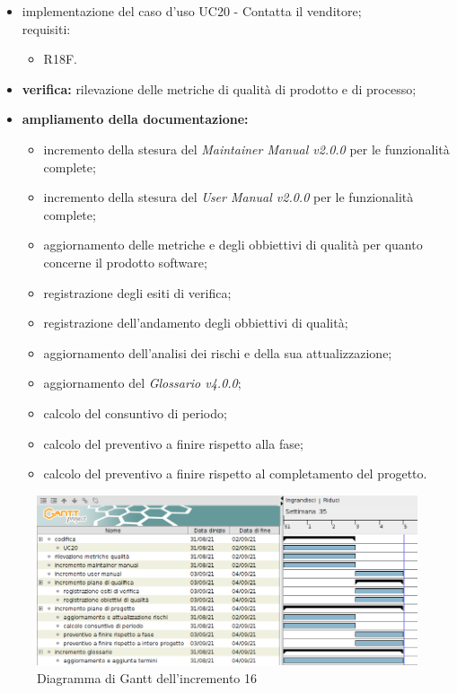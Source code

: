 \begin{itemize}
    \item implementazione del caso d'uso UC20 - Contatta il venditore;\\requisiti:
          \begin{itemize}
              \item R18F.
          \end{itemize}
    \item \textbf{verifica:} rilevazione delle metriche di qualità di prodotto e di processo;
    \item \textbf{ampliamento della documentazione:}
          \begin{itemize}
              \item incremento della stesura del \textit{Maintainer Manual v2.0.0} per le funzionalità complete;
              \item incremento della stesura del \textit{User Manual v2.0.0} per le funzionalità complete;
              \item aggiornamento delle metriche e degli obbiettivi di qualità per quanto concerne il prodotto software;
              \item registrazione degli esiti di verifica;
              \item registrazione dell'andamento degli obbiettivi di qualità;
              \item aggiornamento dell'analisi dei rischi e della sua attualizzazione;
              \item aggiornamento del \textit{Glossario v4.0.0};
              \item calcolo del consuntivo di periodo;
              \item calcolo del preventivo a finire rispetto alla fase;
              \item calcolo del preventivo a finire rispetto al completamento del progetto.
          \end{itemize}
\end{itemize}
\begin{figure}[!ht]
    \caption{Diagramma di Gantt dell'incremento 16}
    \vspace{5px}
    \includegraphics[scale=0.3]{../../../Images/Diagrammi/Gantt/incremento16.png}
    \centering
\end{figure}
\pagebreak
